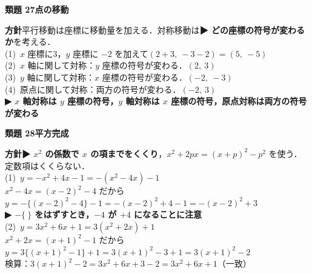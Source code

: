 \documentclass[a4paper,11pt]{ltjsarticle}
\newcommand{\ans}[2]{\Needspace{5\baselineskip}\vspace{6pt}%
  {\sffamily\bfseries 類題 #1\quad #2}\par}
\newcommand{\point}[1]{\textsf{\bfseries ▶ #1}}
\newcommand{\ax}[4]{\draw[->] (#1,0)--(#2,0) node[right]{\scriptsize $x$};
  \draw[->] (0,#3)--(0,#4) node[above]{\scriptsize $y$};
  \node[below left] at (0,0){\scriptsize O};}
\begin{document}
\ans{27}{点の移動}
\begin{kai}
\textbf{方針}\quad 平行移動は座標に移動量を加える．対称移動は\point{どの座標の符号が変わるか}を考える．\\[2pt]
(1)\ $x$ 座標に3，$y$ 座標に $-2$ を加えて\quad $(2+3,\ -3-2)=(5,\ -5)$\\[2pt]
(2)\ $x$ 軸に関して対称：$y$ 座標の符号が変わる．\quad $(2,\ 3)$\\[2pt]
(3)\ $y$ 軸に関して対称：$x$ 座標の符号が変わる．\quad $(-2,\ -3)$\\[2pt]
(4)\ 原点に関して対称：両方の符号が変わる．\quad $(-2,\ 3)$\\
\point{$x$ 軸対称は $y$ 座標の符号，$y$ 軸対称は $x$ 座標の符号，原点対称は両方の符号が変わる}
\begin{center}
\end{center}
\end{kai}

\ans{28}{平方完成}
\begin{kai}
\textbf{方針}\quad \point{$x^2$ の係数で $x$ の項までをくくり}，$x^2+2px=(x+p)^2-p^2$ を使う．定数項はくくらない．\\[2pt]
(1)\ $y=-x^2+4x-1=-(x^2-4x)-1$\\
\hspace*{1.5em}$x^2-4x=(x-2)^2-4$ だから\\
\hspace*{1.5em}$y=-\{(x-2)^2-4\}-1=-(x-2)^2+4-1=-(x-2)^2+3$\\
\hspace*{1.5em}\point{$-\{\ \}$ をはずすとき，$-4$ が $+4$ になることに注意}\\[2pt]
(2)\ $y=3x^2+6x+1=3(x^2+2x)+1$\\
\hspace*{1.5em}$x^2+2x=(x+1)^2-1$ だから\\
\hspace*{1.5em}$y=3\{(x+1)^2-1\}+1=3(x+1)^2-3+1=3(x+1)^2-2$\\
\hspace*{1.5em}検算：$3(x+1)^2-2=3x^2+6x+3-2=3x^2+6x+1$\quad（一致）
\end{kai}
\end{document}
